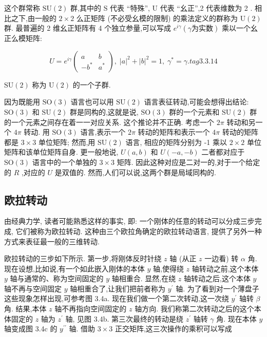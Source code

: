 这个群常称 $\mathrm{{SU}}\left( 2\right)$ 群,其中的 $\mathrm{S}$ 代表 “特殊”, $\mathrm{U}$ 代表 “幺正”,2 代表维数为 2 . 相比之下,由一般的 $2 \times 2$ 么正矩阵 (不必受幺模的限制) 的乘法定义的群称为 $\mathrm{U}\left( 2\right)$ 群. 最普遍的 2 维幺正矩阵有 4 个独立参量,可以写成 ${e}^{i\gamma }\left( {\gamma \text{为实数}}\right)$ 乘以一个幺正么模矩阵:

$$
U = {e}^{i\gamma }\left( \begin{matrix} a & b \\ - {b}^{ * } & {a}^{ * } \end{matrix}\right) ,\;{\left| a\right| }^{2} + {\left| b\right| }^{2} = 1,\;{\gamma }^{ * } = \gamma . tag{3. 3.14}
$$

$\mathrm{{SU}}\left( 2\right)$ 称为 $\mathrm{U}\left( 2\right)$ 的一个子群.

因为既能用 $\mathrm{{SO}}\left( 3\right)$ 语言也可以用 $\mathrm{{SU}}\left( 2\right)$ 语言表征转动,可能会想得出结论: $\mathrm{{SO}}\left( 3\right)$ 和 $\mathrm{{SU}}\left( 2\right)$ 群是同构的,这就是说, $\mathrm{{SO}}\left( 3\right)$ 群的一个元素和 $\mathrm{{SU}}\left( 2\right)$ 群的一个元素之间存在着一一对应关系. 这个推论并不正确. 考虑一个 ${2\pi }$ 转动和另一个 ${4\pi }$ 转动. 用 $\mathrm{{SO}}\left( 3\right)$ 语言,表示一个 ${2\pi }$ 转动的矩阵和表示一个 ${4\pi }$ 转动的矩阵都是 $3 \times 3$ 单位矩阵; 然而,用 $\mathrm{{SU}}\left( 2\right)$ 语言, 相应的矩阵分别为 -1 乘以 $2 \times 2$ 单位矩阵和该单位矩阵自身. 更一般地说, $U\left( {a, b}\right)$ 和 $U\left( {-a, - b}\right)$ 二者都对应于 $\mathrm{{SO}}\left( 3\right)$ 语言中的一个单独的 $3 \times 3$ 矩阵. 因此这种对应是二对一的,对于一个给定的 $R$ ,对应的 $U$ 是双值的. 然而,人们可以说,这两个群是局域同构的.

\subsection{欧拉转动}

由经典力学, 读者可能熟悉这样的事实, 即: 一个刚体的任意的转动可以分成三步完成, 它们被称为欧拉转动. 这种由三个欧拉角确定的欧拉转动语言, 提供了另外一种方式来表征最一般的三维转动.

欧拉转动的三步如下所示. 第一步,将刚体反时针绕 $z$ 轴 (从正 $z$ 一边看) 转 $\alpha$ 角. 现在设想,比如说,有一个如此嵌入刚体的本体 $y$ 轴,使得绕 $z$ 轴转动之前,这个本体 $y$ 轴与通常的、称为空间固定的 $y$ 轴相重合. 显然,在绕 $z$ 轴转动之后,这个本体 $y$ 轴不再与空间固定 $y$ 轴相重合了,让我们把前者称为 ${y}^{\prime }$ 轴. 为了看到对一个薄盘子这些现象怎样出现,可参考图 3.4a. 现在我们做一个第二次转动,这一次绕 ${y}^{\prime }$ 轴转 $\beta$ 角. 结果,本体 $z$ 轴不再指向空间固定的 $z$ 轴方向. 我们称第二次转动之后的这个本体固定的 $z$ 轴为 ${z}^{\prime }$ 轴, 见图 3.4b. 第三次最终的转动是绕 ${z}^{\prime }$ 轴转 $\gamma$ 角. 现在本体 $y$ 轴变成图 3.4c 的 ${y}^{\prime \prime }$ 轴. 借助 $3 \times 3$ 正交矩阵,这三次操作的乘积可以写成

